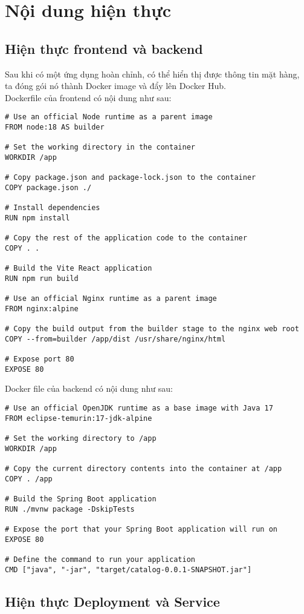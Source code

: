 \section{Nội dung hiện thực}
\subsection{Hiện thực frontend và backend}
\noindent Sau khi có một ứng dụng hoàn chỉnh, có thể hiển thị được thông tin mặt hàng, ta đóng gói nó thành Docker image và đẩy lên Docker Hub.\\[0.5cm]
Dockerfile của frontend có nội dung như sau:
\begin{lstlisting}[language=Docker]
# Use an official Node runtime as a parent image
FROM node:18 AS builder

# Set the working directory in the container
WORKDIR /app

# Copy package.json and package-lock.json to the container
COPY package.json ./

# Install dependencies
RUN npm install

# Copy the rest of the application code to the container
COPY . .

# Build the Vite React application
RUN npm run build

# Use an official Nginx runtime as a parent image
FROM nginx:alpine

# Copy the build output from the builder stage to the nginx web root
COPY --from=builder /app/dist /usr/share/nginx/html

# Expose port 80
EXPOSE 80
\end{lstlisting}

Docker file của backend có nội dung như sau:
\begin{lstlisting}[language=Docker]
# Use an official OpenJDK runtime as a base image with Java 17
FROM eclipse-temurin:17-jdk-alpine

# Set the working directory to /app
WORKDIR /app

# Copy the current directory contents into the container at /app
COPY . /app

# Build the Spring Boot application
RUN ./mvnw package -DskipTests

# Expose the port that your Spring Boot application will run on
EXPOSE 80

# Define the command to run your application
CMD ["java", "-jar", "target/catalog-0.0.1-SNAPSHOT.jar"]
\end{lstlisting}

\subsection{Hiện thực Deployment và Service}
